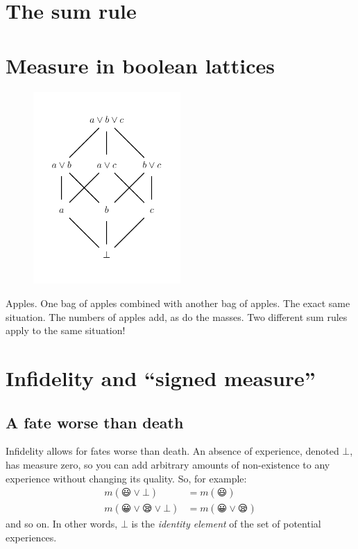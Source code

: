 \documentclass[a4paper, 12pt]{article}
\begin{document}
\section{The sum rule}

\section{Measure in boolean lattices}


\begin{figure}[!ht]
\centering
\includegraphics[width=0.5\textwidth]{figures/boolean_lattice.pdf}
\caption{\label{fig:boolean_lattice}}
\end{figure}


Apples.
One bag of apples combined with another bag of apples.
The exact same situation. The numbers of apples add, as
do the masses. Two different sum rules apply to the same
situation!


\section{Infidelity and ``signed measure''}

\subsection{A fate worse than death}

Infidelity allows for fates worse than death.
An absence of experience, denoted $\bot$,
has measure zero, so you can add arbitrary amounts
of non-existence to any experience without changing
its quality. So, for example:
\begin{align}
m(😃 \vee \bot)        &= m(😃)\\
m(😀 \vee 😪 \vee \bot) &= m(😀 \vee 😪)
\end{align}
and so on.
In other words, $\bot$ is the {\em identity element}
of the set of potential experiences.
\end{document}
